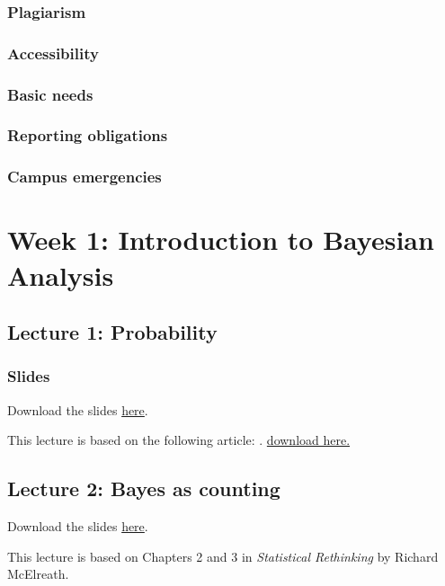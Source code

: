 \documentclass[
]{book}
\begin{document}
\subsection{Plagiarism}\label{plagiarism}

\subsection{Accessibility}\label{accessibility}

\subsection{Basic needs}\label{basic-needs}

\subsection{Reporting obligations}\label{reporting-obligations}

\subsection{Campus emergencies}\label{campus-emergencies}

\chapter{Week 1: Introduction to Bayesian Analysis}\label{week-1-introduction-to-bayesian-analysis}

\section{Lecture 1: Probability}\label{lecture-1-probability}

\subsection{Slides}\label{slides}

Download the slides \href{lectures/lecture01-1.html}{here}.

This lecture is based on the following article: \citet{etz_introduction_2018-1}. \href{readings/Etz\%20and\%20Vandekerckhove\%20-\%202018\%20-\%20Introduction\%20to\%20Bayesian\%20Inference\%20for\%20Psychology.pdf}{download here.}

\section{Lecture 2: Bayes as counting}\label{lecture-2-bayes-as-counting}

Download the slides \href{lectures/lecture01-2.html}{here}.

This lecture is based on Chapters 2 and 3 in \emph{Statistical Rethinking} by Richard McElreath.


\end{document}
